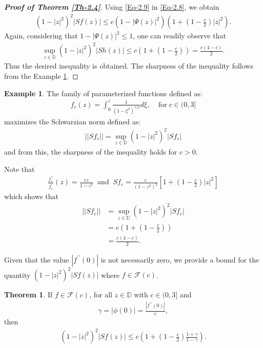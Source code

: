 \documentclass[a4paper,12pt]{amsart}
\theoremstyle{plain}
\theoremstyle{definition}
\newtheorem{exm}{Example}[section]
\newtheorem{thm}{Theorem}[section]
\theoremstyle{plain}
\begin{document}
\begin{proof}[\bf Proof of Theorem \ref{Th-2.4}]
		Using \eqref{Eq-2.9} in \eqref{Eq-2.8}, we obtain
		\begin{align*}
			(1-|z|^2)^2|Sf(z)|\leq c(1-|\Psi(z)|^2)\left(1+\left(1-\frac{c}{2}\right)|z|^2\right).
		\end{align*}
		Again, considering that $1-|\Psi(z)|^2\leq 1$, one can readily observe that
		\begin{align*}
			\sup_{z\in\mathbb{D}}(1-|z|^2)^2|Sh(z)|\leq c\left(1+\left(1-\frac{c}{2}\right)\right)=\frac{c(4-c)}{2}.\nonumber
		\end{align*}
		Thus the desired inequality is obtained. The sharpness of the inequality follows from the Example \ref{Example-2.1}.
	\end{proof}

\begin{exm}\label{Example-2.1}
	The family of parameterized functions defined as:
	\begin{align*}
		f_c (z)=\int_{0}^{z}\frac{1}{(1-\xi^2)^{c/2}} d\xi,\;\;\;\;\mbox{for}\;c\in(0,3]
	\end{align*}
	maximizes the Schwarzian norm defined as:
	\begin{align*}
		||Sf_{c}||=\sup_{z\in\mathbb{D}}(1-|z|^2)^2|Sf_{c}| 
	\end{align*}
	and from this, the sharpness of the inequality holds for $c>0$.\vspace{2mm} 
	
	\noindent Note that
	\begin{align*}
		\frac{f^{\prime\prime}_c}{f_c^{\prime}}(z)=\frac{c z}{1-z^2}\;\;\mbox{and}\;\;Sf_c=\frac{c}{(1-z^2)^2}\left[1+\left(1-\frac{c}{2}\right)|z|^2\right]
	\end{align*}
	which shows that
	\begin{align*}
		||Sf_c||&=\sup_{z\in\mathbb{D}}(1-|z|^2)^2|Sf_c|\\&=c\left(1+\left(1-\frac{c}{2}\right)\right)\\&=\frac{c(4-c)}{2
		}.
	\end{align*}
\end{exm}
Given that the value $|f^{\prime\prime}(0)|$ is not necessarily zero,  we provide a bound for the quantity $(1-|z|^2)^2|Sf(z)|$ where  $f\in\mathcal{F}(c)$.
\begin{thm}\label{Th-2.5}
	If $f\in\mathcal{F}(c)$, for all $z\in\mathbb{D}$ with $c\in(0,3]$ and 
	\begin{align*}
		\gamma=|\phi(0)|=\frac{|f^{\prime\prime}(0)|}{c},
	\end{align*}
	then 
	\begin{align*}
		(1-|z|^2)^2|Sf(z)|\leq c\left(1+\left(1-\frac{c}{2}\right)\frac{1+\gamma}{1-\gamma}\right).
	\end{align*}
\end{thm}
\end{document}
